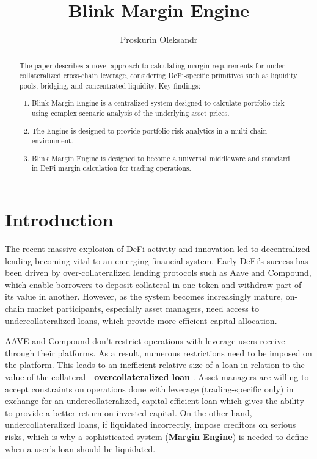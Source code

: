 \documentclass[conference]{IEEEtran}
\begin{document}
 
\title{Blink Margin Engine}
\author{Proskurin Oleksandr}

\maketitle
    \begin{abstract}
The paper describes a novel approach to calculating margin requirements for under-collateralized cross-chain leverage, considering DeFi-specific primitives such as liquidity pools, bridging, and concentrated liquidity. 
Key findings: 
\begin{enumerate}
  \item Blink Margin Engine is a centralized system designed to calculate portfolio risk using complex scenario analysis of the underlying asset prices.
  \item The Engine is designed to provide portfolio risk analytics in a multi-chain environment. 
  \item Blink Margin Engine is designed to become a universal middleware and standard in DeFi margin calculation for trading operations.
  \end{enumerate}
\end{abstract}





\section{Introduction}
The recent massive explosion of DeFi activity and innovation led to decentralized lending becoming vital to an emerging financial system. Early DeFi's success has been driven by over-collateralized lending protocols such as Aave and Compound, which enable borrowers to deposit collateral in one token and withdraw part of its value in another. However, as the system becomes increasingly mature, on-chain market participants, especially asset managers, need access to undercollateralized loans, which provide more efficient capital allocation.

AAVE and Compound don't restrict operations with leverage users receive through their platforms. As a result, numerous restrictions need to be imposed on the platform. This leads to an inefficient relative size of a loan in relation to the value of the collateral - \textbf {overcollateralized loan} \cite{aave-whitepaper} \cite{compound-whitepaper}. Asset managers are willing to accept constraints on operations done with leverage (trading-specific only) in exchange for an undercollateralized, capital-efficient loan which gives the ability to provide a better return on invested capital. On the other hand, undercollateralized loans, if liquidated incorrectly, impose creditors on serious risks, which is why a sophisticated system (\textbf {Margin Engine}) is needed to define when a user's loan should be liquidated. 
\end{document}
